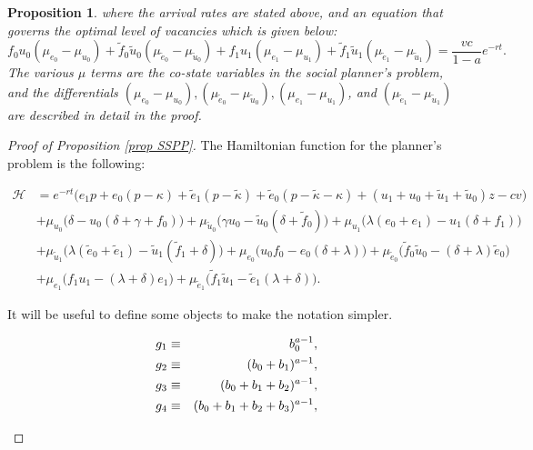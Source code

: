 \documentclass[12pt]{article} %
\newtheorem{proposition}{Proposition}
\theoremstyle{definition}
\begin{document}
\begin{proposition}
where the arrival rates are stated above, and an equation that governs the optimal level of vacancies which is given below: 
\begin{equation}
f_0u_0(\mu_{e_0}-\mu_{u_0}) + \tilde{f}_0\tilde{u}_0(\mu_{\tilde{e}_0}-\mu_{\tilde{u}_0}) +f_1u_1(\mu_{e_1}-\mu_{u_1})+\tilde{f}_1\tilde{u}_1(\mu_{\tilde{e}_1}-\mu_{\tilde{u}_1}) = \frac{vc}{1-a}e^{-rt}.\label{eq_planner}
\end{equation}
The various $\mu$ terms are the co-state variables in the social planner's problem, and the differentials $(\mu_{e_0}-\mu_{u_0}), (\mu_{\tilde{e}_0}-\mu_{\tilde{u}_0}), (\mu_{e_1}-\mu_{u_1})$, and $(\mu_{\tilde{e}_1}-\mu_{\tilde{u}_1})$ are described in detail in the proof.
\end{proposition}

\begin{proof}[Proof of Proposition \ref{prop SSPP}]

\noindent The Hamiltonian function for the planner's problem is the following:
\begin{fleqn}
\begin{equation*}
\begin{split}
\mathcal{H} & = e^{-rt}\bigl(e_1p + e_0(p-\kappa) + \tilde{e}_1(p-\tilde{\kappa}) + \tilde{e}_0(p-\tilde{\kappa}-\kappa) + (u_1+u_0+\tilde{u}_1+\tilde{u}_0)z -cv\bigr)   \\
&+ \mu_{u_0}\bigl(\delta - u_0(\delta+\gamma+f_0)\bigr) +\mu_{\tilde{u}_0} \bigl(\gamma u_0 -\tilde{u}_0(\delta+\tilde{f}_0)\bigr) + \mu_{u_1}\bigl(\lambda(e_0+e_1)-u_1(\delta+f_1)\bigr) \\
&+ \mu_{\tilde{u}_1}\bigl(\lambda(\tilde{e}_0+\tilde{e}_1) -\tilde{u}_1(\tilde{f}_1+\delta)\bigr) + \mu_{e_0}\bigl(u_0f_0-e_0(\delta+\lambda)\bigr) + \mu_{\tilde{e}_0}\bigl(\tilde{f}_0\tilde{u}_0-(\delta+\lambda)\tilde{e}_0\bigr)  \\
&+ \mu_{e_1}\bigl(f_1u_1-(\lambda+\delta)e_1\bigr) + \mu_{\tilde{e}_1}\bigl(\tilde{f}_1\tilde{u}_1-\tilde{e}_1(\lambda+\delta)\bigr).
\end{split}
\end{equation*}
\end{fleqn}

\noindent It will be useful to define some objects to make the notation simpler.

\begin{fleqn}
\begin{eqnarray}
g_1 &\equiv& b_0^{a-1}, \notag \\
g_2 &\equiv& (b_0+b_1)^{a-1},\notag  \\
g_3 &\equiv& (b_0+b_1+b_2)^{a-1},\notag  \\
g_4 &\equiv& (b_0+b_1+b_2+b_3)^{a-1}, \notag
\end{eqnarray}
\end{fleqn}


\end{proof}
\end{document}
